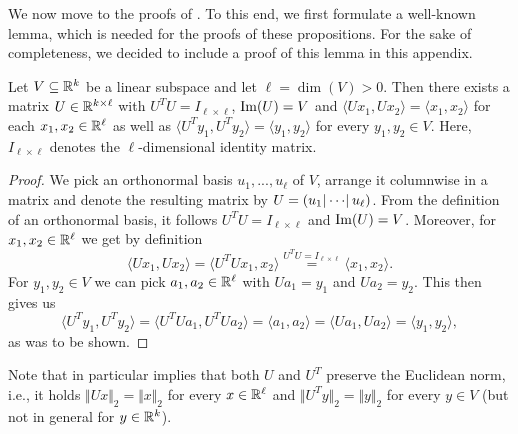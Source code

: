 We now move to the proofs of . To this end, we first formulate a well-known lemma, which is needed for the proofs of these propositions. For the sake of completeness, we decided to include a proof of this lemma in this appendix.
\begin{lemma}\label{lem:Uhelp}
Let $V \subseteq \mathbb{R}^k$ be a linear subspace and let $\ell = \dim(V)>0$. Then there exists a matrix $U \in \mathbb{R}^{k \times \ell}$ with $U^TU = I_{\ell \times \ell}$, $\operatorname{Im}(U) = V$ and $\langle Ux_1, Ux_2 \rangle = \langle x_1,x_2 \rangle$ for each $x_1,x_2 \in \mathbb{R}^\ell$ as well as $\langle U^Ty_1, U^Ty_2 \rangle = \langle y_1,y_2 \rangle$ for every $y_1,y_2 \in V$. Here, $I_{\ell \times \ell}$ denotes the $\ell$-dimensional identity matrix.
\end{lemma}
\renewcommand*{\proofname}{Proof}
\begin{proof}
We pick an orthonormal basis $u_1,...,u_\ell$ of $V$, arrange it columnwise in a matrix and denote the resulting matrix by $U = (u_1 \hspace{0.05cm}\vline \hspace{0.05cm}\cdots \hspace{0.05cm}\vline\hspace{0.05cm} u_\ell)$. From the definition of an orthonormal basis, it follows $U^T U = I_{\ell \times \ell}$ and $\operatorname{Im}(U)=V$. Moreover, for $x_1,x_2 \in \mathbb{R}^\ell$ we get by definition
\begin{equation*}
\langle Ux_1, Ux_2 \rangle = \langle U^T U x_1, x_2 \rangle \overset{U^T U = I_{\ell \times \ell}}{=} \langle x_1, x_2 \rangle.
\end{equation*}
For $y_1,y_2 \in V$ we can pick $a_1,a_2 \in \mathbb{R}^\ell$ with $Ua_1 = y_1$ and $Ua_2 = y_2$. This then gives us
\begin{equation*}
\langle U^Ty_1, U^Ty_2 \rangle = \langle U^T U a_1, U^T U a_2 \rangle = \langle a_1, a_2 \rangle = \langle Ua_1, Ua_2 \rangle = \langle y_1, y_2 \rangle,
\end{equation*}
as was to be shown.
\end{proof}
Note that  in particular implies that both $U$ and $U^T$ preserve the Euclidean norm, i.e., it holds $\Vert Ux \Vert_2 = \Vert x \Vert_2$ for every $x \in \mathbb{R}^\ell$ and $\Vert U^T y \Vert_2 = \Vert y \Vert_2$ for every $y \in V$ (but not in general for $y \in \mathbb{R}^k$).

